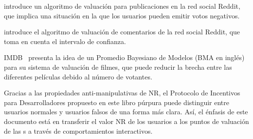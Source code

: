\cite{salihefendic2010reddit} introduce un algoritmo de valuación para publicaciones en la red social Reddit, que implica una situación en la que los usuarios pueden emitir votos negativos.

\cite{miller2009how} introduce el algoritmo de valuación de comentarios de la red social Reddit, que toma en cuenta el intervalo de confianza.

IMDB~\cite{IMDB} presenta la idea de un Promedio Bayesiano de Modelos (BMA en inglés) para su sistema de valuación de filmes, que puede reducir la brecha entre las diferentes películas debido al número de votantes.

Gracias a las propiedades anti-manipulativas de NR, el Protocolo de Incentivos para Desarrolladores propuesto en este libro púrpura puede distinguir entre usuarios normales y usuarios falsos de una forma más clara. Así, el énfasis de este documento está en transferir el valor NR de los usuarios a los puntos de valuación de las {\dapp}s a través de comportamientos interactivos.